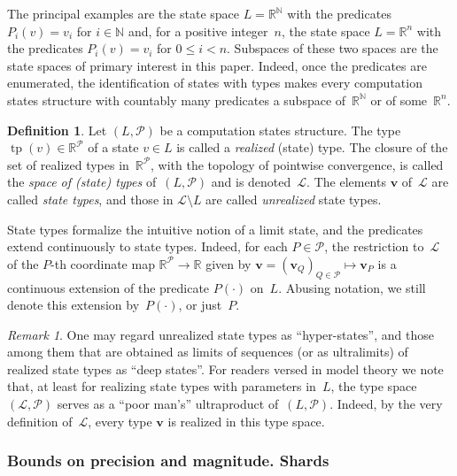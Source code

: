 \documentclass[psamsfonts]{amsart}
\theoremstyle{definition}
\newtheorem{defn}[thm]{Definition}
\theoremstyle{remark}
\newtheorem{rem}[thm]{Remark}
\DeclareMathOperator{\tp}{tp}
\numberwithin{equation}{section}
\begin{document}
The principal examples are the state space $L=\mathbb{R}^\mathbb{N}$ with the predicates $P_i(v) = v_i$ for $i\in\mathbb{N}$ and, for a positive integer~$n$, the state space $L=\mathbb{R}^n$ with the predicates $P_i(v)=v_i$ for $0\le i<n$.
Subspaces of these two spaces are the state spaces of primary interest in this paper.
Indeed, once the predicates are enumerated, the identification of states with types makes every computation states structure with countably many predicates a subspace of~$\mathbb{R}^\mathbb{N}$ or of some~$\mathbb{R}^n$.

\begin{defn}
  Let $(L,\mathcal{P})$ be a computation states structure.
  The type $\tp(v)\in \mathbb{R}^{\mathcal{P}}$ of a state $v\in L$ is called a \emph{realized} (state) type.
  The closure of the set of realized types in~$\mathbb{R}^\mathcal{P}$, with the topology of pointwise convergence, is called the \emph{space of (state) types} of~$(L,\mathcal{P})$ and is denoted~$\mathcal{L}$.
  The elements $\mathbf{v}$ of~$\mathcal{L}$ are called \emph{state types}, and those in $\mathcal{L}\setminus L$ are called \emph{unrealized} state types.
\end{defn}

State types formalize the intuitive notion of a limit state, and the predicates extend continuously to state types.
Indeed, for each $P\in \mathcal{P}$, the restriction to~$\mathcal{L}$ of the $P$-th coordinate map $\mathbb{R}^{\mathcal{P}}\to \mathbb{R}$ given by $\mathbf{v} = (\mathbf{v}_Q)_{Q\in \mathcal{P}}\mapsto \mathbf{v}_P$ is a continuous extension of the predicate $P(\cdot)$ on~$L$.
Abusing notation, we still denote this extension by~$P(\cdot)$, or just~$P$.

\begin{rem}\label{rem:poor-mans-ultraprod}
  One may regard unrealized state types as “hyper-states”, and those among them that are obtained as limits of sequences (or as ultralimits) of realized state types as “deep states”.
  For readers versed in model theory we note that, at least for realizing state types with parameters in~$L$, the type space $(\mathcal{L}, \mathcal{P})$ serves as a “poor man’s” ultraproduct of~$(L, \mathcal{P})$.
  Indeed, by the very definition of~$\mathcal{L}$, every type $\mathbf{v}$ is realized in this type space.
\end{rem}

\subsubsection{Bounds on precision and magnitude. Shards}
\label{sec:shards}
\end{document}
